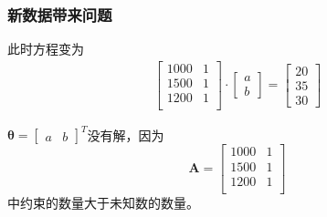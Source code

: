 \documentclass[14pt]{beamer}
\newcommand{\mat}[1]{\bm{#1}}
\renewcommand{\vec}[1]{\bm{#1}}
\begin{document}
\begin{frame}
    \frametitle{新数据带来问题}
    此时方程变为
    \begin{align*}
        \begin{bmatrix}
            1000 & 1\\
            1500 & 1\\
            1200 & 1\\
        \end{bmatrix}\cdot
        \begin{bmatrix}
            a \\
            b
        \end{bmatrix}=
        \begin{bmatrix}
            20\\
            35\\
            30
        \end{bmatrix}
    \end{align*}

    $\vec{\theta}=
    \begin{bmatrix}
        a & b
    \end{bmatrix}^T$没有解，因为
    \[
        \mat{A}=    
        \begin{bmatrix}
            1000 & 1\\
            1500 & 1\\
            1200 & 1\\
        \end{bmatrix}
        \]
    中约束的数量大于未知数的数量。
    \end{frame}
\end{document}

